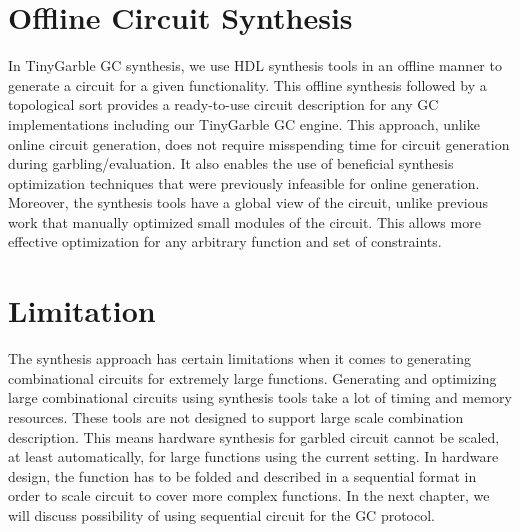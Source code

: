 \section{Offline Circuit Synthesis}
In TinyGarble GC synthesis, we use HDL synthesis tools in an offline manner to generate a circuit for a given functionality.
This offline synthesis followed by a topological sort provides a ready-to-use circuit description for any GC implementations including our TinyGarble GC engine.
This approach, unlike online circuit generation, does not require misspending time for circuit generation during garbling/evaluation.
It also enables the use of beneficial synthesis optimization techniques that were previously infeasible for online generation.
Moreover, the synthesis tools have a global view of the circuit, unlike previous work that manually optimized small modules of the circuit.
This allows more effective optimization for any arbitrary function and set of constraints.

\section{Limitation}\label{sect:syn-limit}
The synthesis approach has certain limitations when it comes to generating combinational circuits for extremely large functions.
Generating and optimizing large combinational circuits using synthesis tools take a lot of timing and memory resources.
These tools are not designed to support large scale combination description.
This means hardware synthesis for garbled circuit cannot be scaled, at least automatically, for large functions using the current setting.
In hardware design, the function has to be folded and described in a sequential format in order to scale circuit to cover more complex functions.
In the next chapter, we will discuss possibility of using sequential circuit for the GC protocol.
